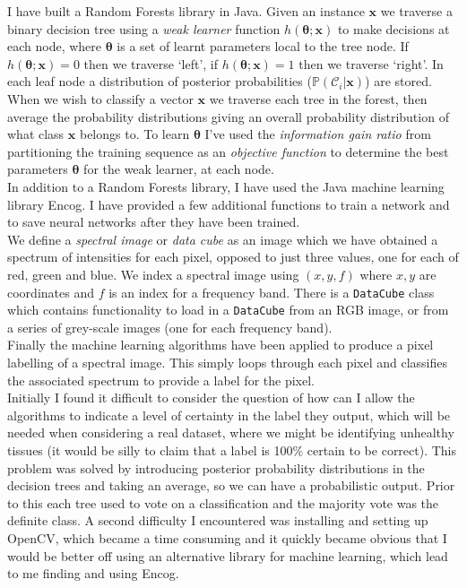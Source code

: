 \documentclass[12pt,a4paper,twoside]{article}
\newcommand{\vc}[1]{\mathbf{#1}}
\begin{document}
I have built a Random Forests library in Java. Given an instance $\vc{x}$ we traverse a binary decision tree using a \textit{weak learner} function $h(\vc{\theta}; \vc{x})$ to make decisions at each node, where $\vc{\theta}$ is a set of learnt parameters local to the tree node. If $h(\vc{\theta}; \vc{x}) = 0$ then we traverse `left', if $h(\vc{\theta}; \vc{x}) = 1$ then we traverse `right'. In each leaf node a distribution of posterior probabilities ($\mathbb{P}(\mathcal{C}_i | \vc{x})$) are stored. When we wish to classify a vector $\vc{x}$ we traverse each tree in the forest, then average the probability distributions giving an overall probability distribution of what class $\vc{x}$ belongs to. To learn $\vc{\theta}$ I've used the \textit{information gain ratio} from partitioning the training sequence as an \textit{objective function} to determine the best parameters $\vc{\theta}$ for the weak learner, at each node. \\

In addition to a Random Forests library, I have used the Java machine learning library Encog. I have provided a few additional functions to train a network and to save neural networks after they have been trained. \\

We define a \textit{spectral image} or \textit{data cube} as an image which we have obtained a spectrum of intensities for each pixel, opposed to just three values, one for each of red, green and blue. We index a spectral image using $(x, y, f)$ where $x,y$ are coordinates and $f$ is an index for a frequency band. There is a \texttt{DataCube} class which contains functionality to load in a \texttt{DataCube} from an RGB image, or from a series of grey-scale images (one for each frequency band). \\

Finally the machine learning algorithms have been applied to produce a pixel labelling of a spectral image. This simply loops through each pixel and classifies the associated spectrum to provide a label for the pixel. \\

Initially I found it difficult to consider the question of how can I allow the algorithms to indicate a level of certainty in the label they output, which will be needed when considering a real dataset, where we might be identifying unhealthy tissues (it would be silly to claim that a label is 100\% certain to be correct). This problem was solved by introducing posterior probability distributions in the decision trees and taking an average, so we can have a probabilistic output. Prior to this each tree used to vote on a classification and the majority vote was the definite class. A second difficulty I encountered was installing and setting up OpenCV, which became a time consuming and it quickly became obvious that I would be better off using an alternative library for machine learning, which lead to me finding and using Encog.
\end{document}
